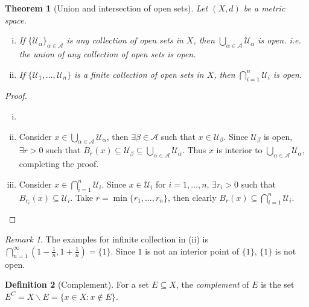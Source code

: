 \documentclass[12pt, lettersize]{book}
\theoremstyle{plain}
\newtheorem{thm}{Theorem}[section]
\theoremstyle{definition}
\newtheorem{dfn}[thm]{Definition}
\theoremstyle{remark}
\newtheorem*{rem}{Remark}
\begin{document}
		\begin{thm}[Union and intersection of open sets]\label{thm: Union and intersection of open sets}
		Let $(X,d)$ be a metric space.
		\begin{enumerate}[(i)]
			\item If $\{\mathcal{U}_\alpha\}_{\alpha\in \mathcal{A}}$ is any collection of open sets in $X$, then $\bigcup_{\alpha\in \mathcal{A}}\mathcal{U}_\alpha$ is open. i.e. the union of \emph{any} collection of open sets is open.
			\item If $\{\mathcal{U}_1,\dots,\mathcal{U}_n\}$ is a finite collection of open sets in $X$, then $\bigcap_{i=1}^{n}\mathcal{U}_i$ is open.
		\end{enumerate}
		\end{thm}
		\begin{proof}
		\begin{enumerate}[(i)]
			\item[]
			\item Consider $x\in\bigcup_{\alpha\in \mathcal{A}}\mathcal{U}_\alpha$, then $\exists \beta\in\mathcal{A}$ such that $x\in\mathcal{U}_\beta$. Since $\mathcal{U}_\beta$ is open, $\exists r>0$ such that $B_r(x)\subseteq\mathcal{U}_\beta\subseteq\bigcup_{\alpha\in \mathcal{A}}\mathcal{U}_\alpha$. Thus $x$ is interior to $\bigcup_{\alpha\in \mathcal{A}}\mathcal{U}_\alpha$, completing the proof.
			\item Consider $x\in\bigcap_{i=1}^{n}\mathcal{U}_i$. Since $x\in\mathcal{U}_i$ for $i=1,\dots,n$, $\exists r_i>0$ such that $B_{r_i}(x)\subseteq\mathcal{U}_i$. Take $r=\min\{r_1,\dots,r_n\}$, then clearly $B_r(x)\subseteq\bigcap_{i=1}^{n}\mathcal{U}_i$.
		\end{enumerate}
		\end{proof}
		\begin{rem}
		The examples for infinite collection in (ii) is $\bigcap_{n=1}^{\infty}(1-\frac{1}{n}, 1+\frac{1}{n})=\{1\}$. Since $1$ is not an interior point of $\{1\}$, $\{1\}$ is not open.
		\end{rem}
	
		\begin{dfn}[Complement]
			For a set $E\subseteq X$, the \emph{complement} of $E$ is the set $E^C=X\backslash E=\{x\in X: x\notin E\}$.
		\end{dfn}
	
\end{document}

